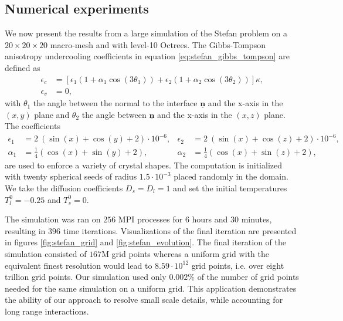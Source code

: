 \subsection{Numerical experiments}
We now present the results from a large simulation of the Stefan problem on a $20\times20\times20$ macro-mesh and with level-10 Octrees. The Gibbs-Tompson anisotropy undercooling coefficients in equation \eqref{eq:stefan_gibbs_tompson} are defined as
\begin{align*}
\epsilon_c & = \left[ \epsilon_1 \left( 1+\alpha_1 \cos(3\theta_1) \right) + \epsilon_2 \left( 1+\alpha_2 \cos(3\theta_2) \right) \right] \kappa,\\
\epsilon_v & = 0,
\end{align*}
with $\theta_1$ the angle between the normal to the interface $\underline{\mathbf{n}}$ and the x-axis in the $(x,y)$ plane and $\theta_2$ the angle between $\underline{\mathbf{n}}$ and the x-axis in the $(x,z)$ plane. The coefficients
\begin{align*}
\epsilon_1 & = 2~(\sin(x)+\cos(y)+2)\cdot10^{-6}, & \epsilon_2 & = 2~(\sin(x)+\cos(z)+2)\cdot10^{-6}, \\
\alpha_1 & = \frac{1}{4}(\cos(x)+\sin(y)+2), & \alpha_2 & = \frac{1}{4}(\cos(x)+\sin(z)+2),
\end{align*}
are used to enforce a variety of crystal shapes. The computation is initialized with twenty spherical seeds of radius $1.5 \cdot 10^{-3}$ placed randomly in the domain. We take the diffusion coefficients $D_s=D_l=1$ and set the initial temperatures $T^0_l=-0.25$ and $T^0_s=0$.

The simulation was ran on $256$ MPI processes for $6$ hours and $30$ minutes, resulting in $396$ time iterations. Visualizations of the final iteration are presented in figures \ref{fig:stefan_grid} and \ref{fig:stefan_evolution}. The final iteration of the simulation consisted of $167$M grid points whereas a uniform grid with the equivalent finest resolution would lead to $8.59\cdot10^{12}$ grid points, i.e. over eight trillion grid points. Our simulation used only $0.002\%$ of the number of grid points needed for the same simulation on a uniform grid. This application demonstrates the ability of our approach to resolve small scale details, while accounting for long range interactions.

